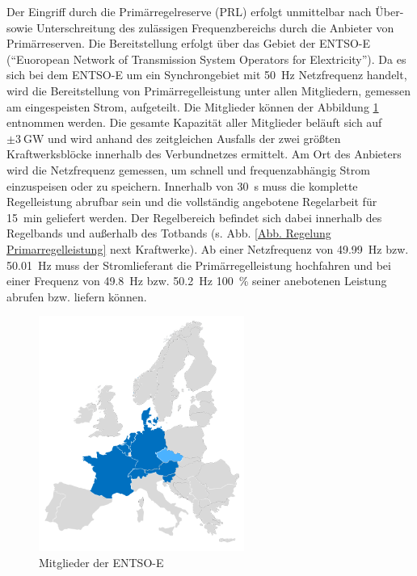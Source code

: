 			Der Eingriff durch die Primärregelreserve (PRL) erfolgt unmittelbar nach Über- sowie Unterschreitung des zulässigen Frequenzbereichs durch die Anbieter von Primärreserven.
			Die Bereitstellung erfolgt über das Gebiet der ENTSO-E ("`Euoropean Network of Transmission System Operators for Elextricity"').
			Da es sich bei dem ENTSO-E um ein Synchrongebiet mit \SI{50}{\hertz} Netzfrequenz handelt, wird die Bereitstellung von Primärregelleistung unter allen Mitgliedern, gemessen am eingespeisten Strom, aufgeteilt.
			Die Mitglieder können der Abbildung \ref{Abb. Mitglieder ENTSO-E} entnommen werden.
			Die gesamte Kapazität aller Mitglieder beläuft sich auf $\pm\SI{3}{\giga\watt}$ und wird anhand des zeitgleichen Ausfalls der zwei größten Kraftwerksblöcke innerhalb des Verbundnetzes ermittelt.
			Am Ort des Anbieters wird die Netzfrequenz gemessen, um schnell und frequenzabhängig Strom einzuspeisen oder zu speichern. 
			Innerhalb von \SI{30}{\second} muss die komplette Regelleistung abrufbar sein und die vollständig angebotene Regelarbeit für \SI{15}{\minute} geliefert werden.
			Der Regelbereich befindet sich dabei innerhalb des Regelbands und außerhalb des Totbands (s. Abb. \ref{Abb. Regelung Primarregelleistung} next Kraftwerke).
			Ab einer Netzfrequenz von \SI{49,99}{\hertz} bzw. \SI{50,01}{\hertz} muss der Stromlieferant die Primärregelleistung hochfahren und bei einer Frequenz von \SI{49,8}{\hertz} bzw. \SI{50,2}{\hertz} \SI{100}{\percent} seiner anebotenen Leistung abrufen bzw. liefern können. 
			
			\begin{figure}[H]
				\centering
				\label{Abb. Mitglieder ENTSO-E}
				\includegraphics[page=1,trim=70 70 70 120, clip, width=0.6\textwidth]{./anhang/frc-map.png}
				\caption{Mitglieder der ENTSO-E \parencite{ENTSO-E_PRL}}
			\end{figure}
			
